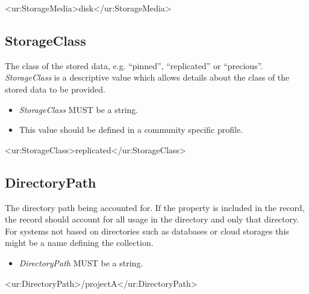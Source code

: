 \begin{XMLexample}
<ur:StorageMedia>disk</ur:StorageMedia>
\end{XMLexample}






\subsection{StorageClass}

The class of the stored data, e.g. ``pinned'', ``replicated''  or ``precious''. \emph{StorageClass} is a descriptive value which allows details about the class of the stored data to be provided.

\begin{itemize}
\item \emph{StorageClass} MUST be a string.
\item This value should be defined in a community specific profile.
\end{itemize}

\begin{XMLexample}
<ur:StorageClass>replicated</ur:StorageClass>
\end{XMLexample}






\subsection{DirectoryPath}

The directory path being accounted for. If the property is included in the record, the record should account for all usage in the directory and only that directory. For systems not based on directories such as databases or cloud storages this might be a name defining the collection.

\begin{itemize}
\item \emph{DirectoryPath} MUST be a string.
\end{itemize}

\begin{XMLexample}
<ur:DirectoryPath>/projectA</ur:DirectoryPath>
\end{XMLexample}



